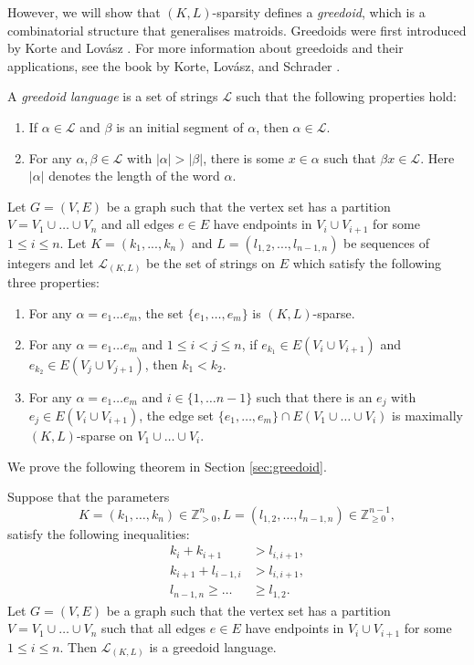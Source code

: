 \documentclass{article}
\begin{document}
However, we will show that $(K,L)$-sparsity defines a \textit{greedoid}, which is a combinatorial structure that generalises matroids. Greedoids were first introduced by Korte and Lovász \cite{Greedoids_1}. For more information about greedoids and their applications, see the book by Korte, Lovász, and Schrader \cite{Greedoids_2}. 
\begin{definition}
    A \textit{greedoid language} is a set of strings $\mathcal{L}$ such that the following properties hold:
    \begin{enumerate}
        \item If $\alpha \in \mathcal{L}$ and $\beta$ is an initial segment of $\alpha$, then $\alpha \in \mathcal{L}$.
        \item For any $\alpha, \beta \in \mathcal{L}$ with $\vert \alpha \vert > \vert \beta \vert$, there is some $x\in \alpha$ such that $\beta x\in \mathcal{L}$. Here $\vert \alpha \vert$ denotes the length of the word $\alpha$.
    \end{enumerate}
\end{definition}

Let $G=(V,E)$ be a graph such that the vertex set has a partition $V=V_1\cup \dots \cup V_n$ and all edges $e\in E$ have endpoints in $V_{i} \cup V_{i+1}$ for some $1 \leq i \leq n$. Let $K=(k_1,...,k_n)$ and $L=(l_{1,2},...,l_{n-1,n})$ be sequences of integers and let $\mathcal{L}_{(K,L)}$ be the set of strings on $E$ which satisfy the following three properties:
\begin{enumerate}
\item{For any $\alpha=e_1\dots e_m$, the set $\{e_1, \dots, e_m\}$ is $(K,L)$-sparse}.
\item{For any $\alpha=e_1\dots e_m$ and $1\leq i< j \leq n$, if $e_{k_1} \in E(V_i \cup V_{i+1})$ and $e_{k_2} \in  E(V_j \cup V_{j+1})$, then $k_1 < k_2$.}
\item{For any $\alpha=e_1\dots e_m$ and $i\in \{1,\dots n-1\}$ such that there is an $e_j$ with $e_{j}\in E(V_i\cup V_{i+1})$, the edge set $\{e_1, \dots, e_m \} \cap E(V_1\cup \dots \cup V_i)$ is maximally $(K,L)$-sparse on $V_1\cup \dots \cup V_i$. }
\end{enumerate}

\noindent
We prove the following theorem in Section \ref{sec:greedoid}.

\begin{theorem}\label{thm:is_greedoid=true}
Suppose that the parameters $$K=(k_1, \dots, k_n)\in  \mathbb{Z}_{>0}^{n}, L= (l_{1,2}, \dots, l_{n-1,n})\in  \mathbb{Z}_{\geq 0}^{n-1},$$ satisfy the following inequalities:
\begin{align*}
    k_i + k_{i+1} &> l_{i, i+1}, \\
    k_{i+1} + l_{i-1, i} &> l_{i, i+1},\\
     l_{n-1,n} \geq  \dots &\geq l_{1,2}.
\end{align*} 
Let $G=(V,E)$ be a graph such that the vertex set has a partition $V=V_1\cup \dots \cup V_n$ such that all edges $e\in E$ have endpoints in $V_{i} \cup V_{i+1}$ for some $1 \leq i \leq n$. Then $\mathcal{L}_{(K,L)}$ is a greedoid language.
\end{theorem}
\end{document}
